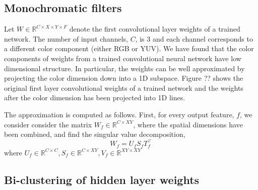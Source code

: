 \documentclass{article}
\begin{document}
\subsection{Monochromatic filters}
Let $W \in \mathbb{R}^{C \times X \times Y \times F}$ denote the first convolutional layer weights of a trained network. The number of input channels, $C$, is 3 and each channel corresponds to a different color component (either RGB or YUV). We have found that the color components of weights from a trained convolutional neural network have low dimensional structure. In particular, the weights can be well approximated by projecting the color dimension down into a 1D subspace. Figure ?? shows the original first layer convolutional weights of a trained network and the weights after the color dimension has been projected into 1D lines. 

The approximation is computed as follows. First, for every output feature, $f$, we consider consider the matrix $W_f \in \mathbb{R}^{C \times XY }$, where the spatial dimensions have been combined, and find the singular value decomposition, 
\begin{equation*}
	W_f = U_f S_f T_f^{\top}
\end{equation*}
where $U_f \in \mathbb{R}^{C \times C}, S_f \in \mathbb{R}^{C \times XY}, V_f \in \mathbb{R}^{XY \times XY}$



\subsection{Bi-clustering of hidden layer weights}
\nocite{*}


\end{document}
